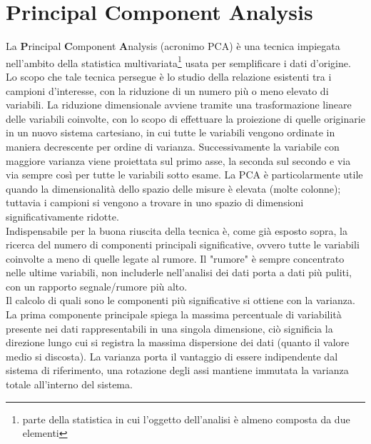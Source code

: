 \section{Principal Component Analysis}
\label{PCA}
La \textbf{P}rincipal \textbf{C}omponent \textbf{A}nalysis (acronimo PCA) \`e una tecnica impiegata nell'ambito della statistica multivariata\footnote{parte della statistica in cui l'oggetto dell'analisi \`e almeno composta da due elementi} usata per semplificare i dati d'origine.\\
Lo scopo che tale tecnica persegue \`e lo studio della relazione esistenti tra i campioni d'interesse, con la riduzione di un numero pi\`u o meno elevato di variabili. La riduzione dimensionale avviene tramite una trasformazione lineare delle variabili coinvolte, con lo scopo di effettuare la proiezione di quelle originarie in un nuovo sistema cartesiano, in cui tutte le variabili vengono ordinate in maniera decrescente per ordine di varianza. Successivamente la variabile con maggiore varianza viene proiettata sul primo asse, la seconda sul secondo e via via sempre cos\`i per tutte le variabili sotto esame. La PCA \`	e particolarmente utile quando la dimensionalit\`a dello spazio delle misure \`e elevata (molte colonne); tuttavia i campioni si vengono a trovare in uno spazio di dimensioni significativamente ridotte.\\
Indispensabile per la buona riuscita della tecnica \`e, come gi\`a esposto sopra, la ricerca del numero di componenti principali significative, ovvero tutte le variabili coinvolte a meno di quelle legate al rumore. Il "rumore" \`e sempre concentrato nelle ultime variabili, non includerle nell'analisi dei dati porta a dati pi\`u puliti, con un rapporto segnale/rumore pi\`u alto.\\
Il calcolo di quali sono le componenti pi\`u significative si ottiene con la varianza. La prima componente principale spiega la massima percentuale di variabilit\`a presente nei dati rappresentabili in una singola dimensione, ci\`o significia la direzione lungo cui si registra la massima dispersione dei dati (quanto il valore medio si discosta). La varianza porta il vantaggio di essere indipendente dal sistema di riferimento, una rotazione degli assi mantiene immutata la varianza totale all'interno del sistema.


